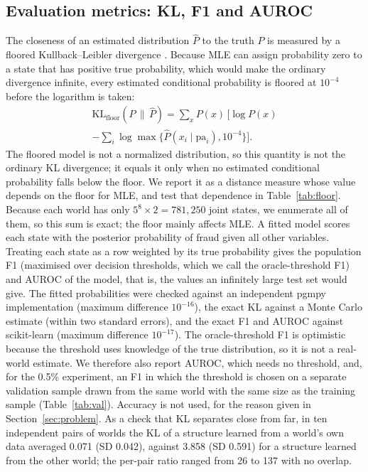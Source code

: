 \documentclass[final,5p,times,authoryear]{elsarticle}
\newcommand{\KL}{\mathrm{KL}}
\begin{document}
\subsection{Evaluation metrics: KL, F1 and AUROC}
The closeness of an estimated distribution $\hat P$ to the truth $P$ is measured by a floored Kullback--Leibler divergence \citep{kullback1951}. Because MLE can assign probability zero to a state that has positive true probability, which would make the ordinary divergence infinite, every estimated conditional probability is floored at $10^{-4}$ before the logarithm is taken:
\begin{multline}
\KL_{\text{floor}}(P\,\|\,\hat P)=\sum_x P(x)\,\Big[\log P(x)\\-\sum_{i}\log\max\{\hat P(x_i\mid \mathrm{pa}_i),10^{-4}\}\Big].
\end{multline}
The floored model is not a normalized distribution, so this quantity is not the ordinary KL divergence; it equals it only when no estimated conditional probability falls below the floor. We report it as a distance measure whose value depends on the floor for MLE, and test that dependence in Table~\ref{tab:floor}. Because each world has only $5^8\times 2=781{,}250$ joint states, we enumerate all of them, so this sum is exact; the floor mainly affects MLE. A fitted model scores each state with the posterior probability of fraud given all other variables. Treating each state as a row weighted by its true probability gives the population F1 (maximised over decision thresholds, which we call the oracle-threshold F1) and AUROC of the model, that is, the values an infinitely large test set would give. The fitted probabilities were checked against an independent pgmpy implementation (maximum difference $10^{-16}$), the exact KL against a Monte Carlo estimate (within two standard errors), and the exact F1 and AUROC against scikit-learn \citep{pedregosa2011} (maximum difference $10^{-17}$). The oracle-threshold F1 is optimistic because the threshold uses knowledge of the true distribution, so it is not a real-world estimate. We therefore also report AUROC, which needs no threshold, and, for the 0.5\% experiment, an F1 in which the threshold is chosen on a separate validation sample drawn from the same world with the same size as the training sample (Table~\ref{tab:val}). Accuracy is not used, for the reason given in Section~\ref{sec:problem}. As a check that KL separates close from far, in ten independent pairs of worlds the KL of a structure learned from a world's own data averaged 0.071 (SD 0.042), against 3.858 (SD 0.591) for a structure learned from the other world; the per-pair ratio ranged from 26 to 137 with no overlap.
\end{document}
